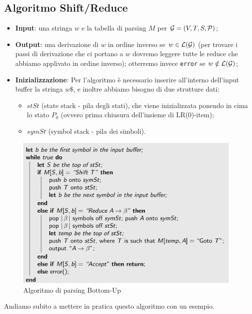 \documentclass[class=book, crop=false, oneside, 12pt]{standalone}
\begin{document}
\subsection{Algoritmo Shift/Reduce}
\begin{itemize}
    \item \textbf{Input}: una stringa \(w\) e la tabella di parsing \(M\) per \(\mathcal{G} = (V, T, S, \mathcal{P})\);
    \item \textbf{Output}: una derivazione di \(w\) in ordine inverso se \(w \in \mathcal{L}(\mathcal{G})\) (per trovare i passi di derivazione che ci portano a \(w\) dovremo leggere tutte le reduce che abbiamo applivato in ordine inverso); otterremo invece \texttt{error} se \(w \notin \mathcal{L}(\mathcal{G})\);
    \item \textbf{Inizializzazione}: Per l'algoritmo è necessario inserire all'interno dell'input buffer la stringa \(w\$\), e inoltre abbiamo bisogno di due strutture dati:
    \begin{itemize}
        \item \(stSt\) (state stack - pila degli stati), che viene inizializzata ponendo in cima lo stato \(P_0\) (ovvero prima chiusura dell'insieme di LR(0)-item);
        \item \(symSt\) (symbol stack - pila dei simboli).
    \end{itemize}
\end{itemize}

\begin{figure}
    \centering
    \includegraphics[width=.8\textwidth]{bottom-up-parsing-algorithm.png}
    \caption{Algoritmo di parsing Bottom-Up}
    \label{fig:bottom-up-parsing-algorithm}    
\end{figure}

Andiamo subito a mettere in pratica questo algoritmo con un esempio.
\end{document}
